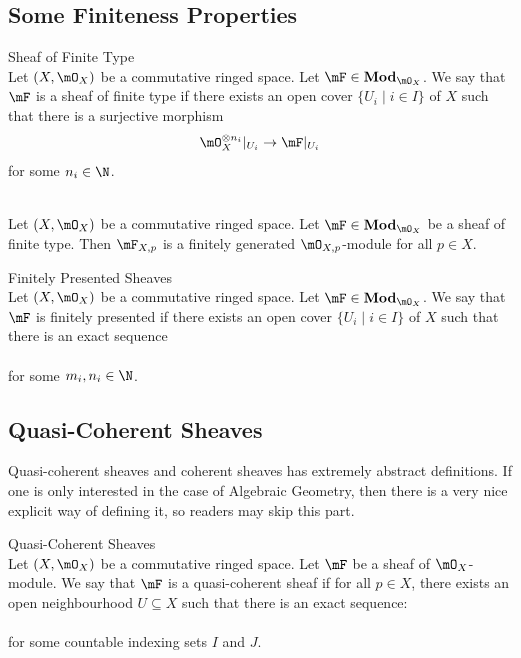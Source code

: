 \documentclass[a4paper]{article}
\begin{document}
\subsection{Some Finiteness Properties}
\begin{defn}{Sheaf of Finite Type}{}\\
Let $(X,\mO_X)$ be a commutative ringed space. Let $\mF\in\bold{Mod}_{\mO_X}$. We say that $\mF$ is a sheaf of finite type if there exists an open cover $\{U_i\;|\;i\in I\}$ of $X$ such that there is a surjective morphism $$\mO_X^{\otimes n_i}|_{U_i}\to\mF|_{U_i}$$ for some $n_i\in\N$. 
\end{defn}

\begin{prp}{}{}\\
Let $(X,\mO_X)$ be a commutative ringed space. Let $\mF\in\bold{Mod}_{\mO_X}$ be a sheaf of finite type. Then $\mF_{X,p}$ is a finitely generated $\mO_{X,p}$-module for all $p\in X$. 
\end{prp}

\begin{defn}{Finitely Presented Sheaves}{}\\
Let $(X,\mO_X)$ be a commutative ringed space. Let $\mF\in\bold{Mod}_{\mO_X}$. We say that $\mF$ is finitely presented if there exists an open cover $\{U_i\;|\;i\in I\}$ of $X$ such that there is an exact sequence \\
\\
for some $m_i,n_i\in\N$. 
\end{defn}

\subsection{Quasi-Coherent Sheaves}
Quasi-coherent sheaves and coherent sheaves has extremely abstract definitions. If one is only interested in the case of Algebraic Geometry, then there is a very nice explicit way of defining it, so readers may skip this part. 

\begin{defn}{Quasi-Coherent Sheaves}{}\\
Let $(X,\mO_X)$ be a commutative ringed space. Let $\mF$ be a sheaf of $\mO_X$-module. We say that $\mF$ is a quasi-coherent sheaf if for all $p\in X$, there exists an open neighbourhood $U\subseteq X$ such that there is an exact sequence: \\
\\
for some countable indexing sets $I$ and $J$. 
\end{defn}
\end{document}
